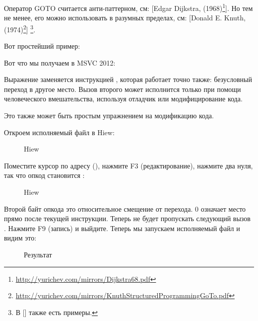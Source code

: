 
Оператор GOTO считается анти-паттерном, см:
[Edgar Dijkstra,  (1968)\footnote{\url{http://yurichev.com/mirrors/Dijkstra68.pdf}}].
Но тем не менее, его можно использовать в разумных пределах, см:
[Donald E. Knuth,  (1974)\footnote{\url{http://yurichev.com/mirrors/KnuthStructuredProgrammingGoTo.pdf}}]
\footnote{В [\CNotes] также есть примеры.}.

Вот простейший пример:



Вот что мы получаем в MSVC 2012:



Выражение  заменяется инструкцией \JMP, которая работает точно также: безусловный переход в другое место.
Вызов второго \printf может исполнится только при помощи человеческого вмешательства, используя отладчик или модифицирование кода.

\par

\clearpage
Это также может быть простым упражнением на модификацию кода.

Откроем исполняемый файл в Hiew:

\begin{figure}[H]
\centering
{}
\caption{Hiew}
\label{fig:goto_hiew1}
\end{figure}

\clearpage
Поместите курсор по адресу \JMP (), 
нажмите F3 (редактирование), нажмите два нуля, так что
опкод становится :

\begin{figure}[H]
\centering
{}
\caption{Hiew}
\label{fig:goto_hiew2}
\end{figure}

Второй байт опкода \JMP это относительное смещение от перехода. 0 означает место
прямо после текущей инструкции.
Теперь \JMP не будет пропускать следующий вызов \printf.
Нажмите F9 (запись) и выйдите.
Теперь мы запускаем исполняемый файл и видим это:

\begin{figure}[H]
\centering
{}
\caption{Результат}
\label{fig:goto_result}
\end{figure}

